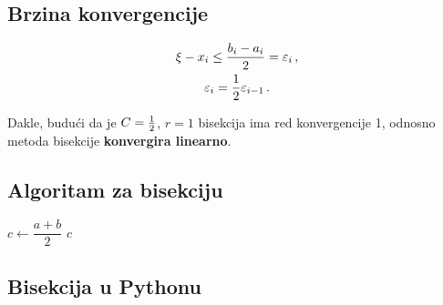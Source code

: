 \subsection{Brzina konvergencije}

\begin{gather*}
    \xi - x_i \leq \frac{b_i-a_i}{2} = \varepsilon_i\,,\\
    \varepsilon_i={1\over 2} \varepsilon_{i-1}\,.
\end{gather*}

Dakle, budući da je $C={1\over 2}$, $r=1$ bisekcija ima red konvergencije 1,
odnosno metoda bisekcije \textbf{konvergira linearno}.


\begin{multicols}{2}
\subsection{Algoritam za bisekciju}
\begin{algorithmic}
    \State $c \gets \dfrac{a + b}{2}$
        \State \Return $c$
    \EndIf
        \State \Return {}
    \Else
        \State \Return {}
    \EndIf
\EndFunction
\end{algorithmic}

\columnbreak

\subsection{Bisekcija u Pythonu}


\end{multicols}

